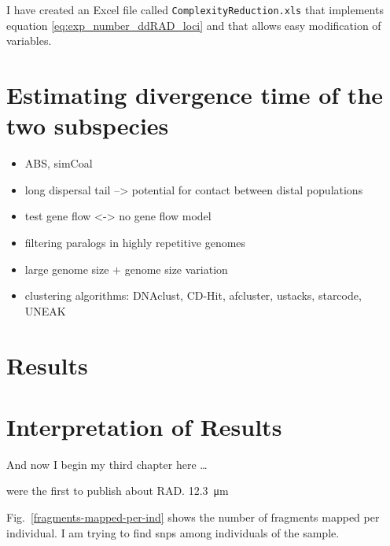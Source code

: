 \documentclass[a4paper,12pt,times,print,index, custombib]{PhDThesisPSnPDF}\usepackage[]{graphicx}\usepackage[]{color}
\begin{document}
I have created an Excel file called \texttt{ComplexityReduction.xls} that implements equation \ref{eq:exp_number_ddRAD_loci} and that allows easy modification of variables.

\section{Estimating divergence time of the two subspecies}

\begin{itemize}
\item ABS, simCoal
\item long dispersal tail --> potential for contact between distal populations
\item test gene flow <-> no gene flow model
\item filtering paralogs in highly repetitive genomes
\item large genome size $+$ genome size variation
\item clustering algorithms: DNAclust, CD-Hit, afcluster, ustacks, starcode, UNEAK
\end{itemize}


\section{Results}

\section{Interpretation of Results}



And now I begin my third chapter here \dots

\cite{Baird2008} were the first to publish about RAD. \SI{12,3}{\micro\metre}

Fig.~\vref{fragments-mapped-per-ind} shows the number of \glspl{fragment} mapped per individual.
I am trying to find \glspl{snp} among individuals of the sample.
\end{document}
